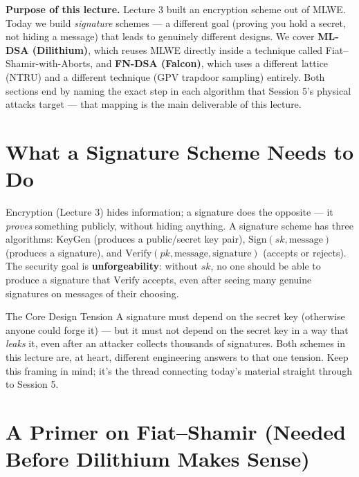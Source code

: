 \begin{notebox}
\small\textbf{Purpose of this lecture.} Lecture 3 built an encryption scheme out of MLWE. Today we build \emph{signature} schemes --- a different goal (proving you hold a secret, not hiding a message) that leads to genuinely different designs. We cover \textbf{ML-DSA (Dilithium)}, which reuses MLWE directly inside a technique called Fiat--Shamir-with-Aborts, and \textbf{FN-DSA (Falcon)}, which uses a different lattice (NTRU) and a different technique (GPV trapdoor sampling) entirely. Both sections end by naming the exact step in each algorithm that Session 5's physical attacks target --- that mapping is the main deliverable of this lecture.
\end{notebox}

\section{What a Signature Scheme Needs to Do}
\label{sec:L4:what-a-signature-scheme-needs-to-do}

Encryption (Lecture 3) hides information; a signature does the opposite --- it \emph{proves} something publicly, without hiding anything. A signature scheme has three algorithms: $\mathrm{KeyGen}$ (produces a public/secret key pair), $\mathrm{Sign}(sk, \text{message})$ (produces a signature), and $\mathrm{Verify}(pk, \text{message}, \text{signature})$ (accepts or rejects). The security goal is \textbf{unforgeability}: without $sk$, no one should be able to produce a signature that $\mathrm{Verify}$ accepts, even after seeing many genuine signatures on messages of their choosing.

\begin{rmkbox}{The Core Design Tension}
A signature must depend on the secret key (otherwise anyone could forge it) --- but it must not depend on the secret key in a way that \emph{leaks} it, even after an attacker collects thousands of signatures. Both schemes in this lecture are, at heart, different engineering answers to that one tension. Keep this framing in mind; it's the thread connecting today's material straight through to Session 5.
\end{rmkbox}

\section{A Primer on Fiat--Shamir (Needed Before Dilithium Makes Sense)}
\label{sec:L4:a-primer-on-fiat-shamir-needed-before-di}

